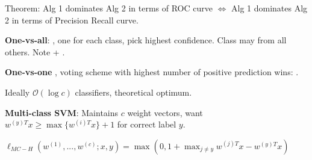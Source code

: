 Theorem: Alg 1 dominates Alg 2 in terms of ROC curve $\Leftrightarrow$ Alg 1 dominates Alg 2 in terms of Precision Recall curve.

\textbf{One-vs-all}: , one for each class, pick highest confidence. Class may
 from all others. Note  + .

\textbf{One-vs-one} , voting scheme with highest number of positive prediction wins: .

Ideally $\mathcal{O}(\log c)$ classifiers, theoretical optimum.

\textbf{Multi-class SVM}: Maintains $c$ weight vectors, want $w^{(y)T} x \geq
\max\{w^{(i)T}x\}+1$ for correct label $y$.

$\ell_{MC-H}(w^{(1)},...,w^{(c)}; x, y) = \max(0, 1 + \max_{j \neq y} w^{(j)T} x - w^{(y)T} x)$ 